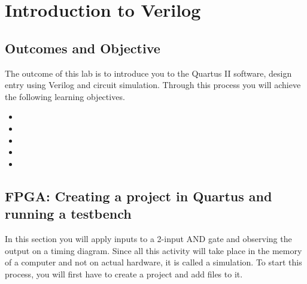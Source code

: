\chapter{Introduction to Verilog}
\label{introductionToVerilog}
\graphicspath{ {./Lab01SimpleVerilog/Fig} }

\section{Outcomes and Objective }

The outcome of this lab is to introduce you to the Quartus II
software, design entry using Verilog and circuit simulation.
Through this process you will achieve the following
learning objectives.
\begin{itemize}
        \itemsep=0em
    \item {}
    \item {}
    \item {}
    \item {}
    \item{}
\end{itemize}

\section{FPGA: Creating a project in Quartus and running a testbench}
In this section you will apply inputs to a 2-input AND gate and
observing the output on a timing diagram.  Since all this activity will
take place in the memory of a computer and not on actual hardware,
it is called a simulation.  To start this process, you will first have to
create a project and add files to it.

